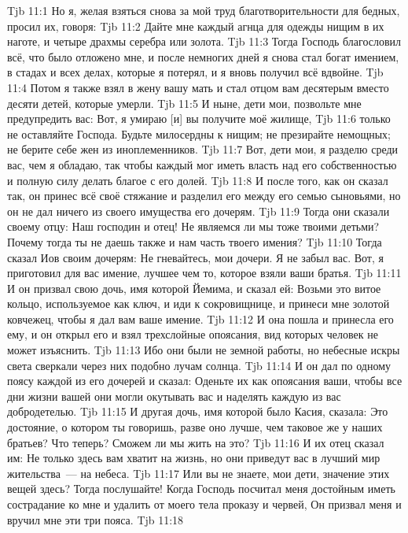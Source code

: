 \vs Tjb 11:1
Но я, желая взяться снова за мой труд благотворительности для бедных, просил их, говоря:
\vs Tjb 11:2
Дайте мне каждый агнца для одежды нищим в их наготе, и четыре драхмы серебра или золота.
\vs Tjb 11:3
Тогда Господь благословил всё, что было отложено мне, и после немногих дней я снова стал богат имением, в стадах и всех делах, которые я потерял, и я вновь получил всё вдвойне.
\vs Tjb 11:4
Потом я также взял в жену вашу мать и стал отцом вам десятерым вместо десяти детей, которые умерли.
\vs Tjb 11:5
И ныне, дети мои, позвольте мне предупредить вас: Вот, я умираю [и] вы получите моё жилище,
\vs Tjb 11:6
только не оставляйте Господа. Будьте милосердны к нищим; не презирайте немощных; не берите себе жен из иноплеменников.
\vs Tjb 11:7
Вот, дети мои, я разделю среди вас, чем я обладаю, так чтобы каждый мог иметь власть над его собственностью и полную силу делать благое с его долей.
\vs Tjb 11:8
И после того, как он сказал так, он принес всё своё стяжание и разделил его между его семью сыновьями, но он не дал ничего из своего имущества его дочерям.
\vs Tjb 11:9
Тогда они сказали своему отцу: Наш господин и отец! Не являемся ли мы тоже твоими детьми? Почему тогда ты не даешь также и нам часть твоего имения?
\vs Tjb 11:10
Тогда сказал Иов своим дочерям: Не гневайтесь, мои дочери. Я не забыл вас. Вот, я приготовил для вас имение, лучшее чем то, которое взяли ваши братья.
\vs Tjb 11:11
И он призвал свою дочь, имя которой Йемима, и сказал ей: Возьми это витое кольцо, используемое как ключ, и иди к сокровищнице, и принеси мне золотой ковчежец, чтобы я дал вам ваше имение.
\vs Tjb 11:12
И она пошла и принесла его ему, и он открыл его и взял трехслойные опоясания, вид которых человек не может изъяснить.
\vs Tjb 11:13
Ибо они были не земной работы, но небесные искры света сверкали через них подобно лучам солнца.
\vs Tjb 11:14
И он дал по одному поясу каждой из его дочерей и сказал: Оденьте их как опоясания ваши, чтобы все дни жизни вашей они могли окутывать вас и наделять каждую из вас добродетелью.
\vs Tjb 11:15
И другая дочь, имя которой было Касия, сказала: Это достояние, о котором ты говоришь, разве оно лучше, чем таковое же у наших братьев? Что теперь? Сможем ли мы жить на это?
\vs Tjb 11:16
И их отец сказал им: Не только здесь вам хватит на жизнь, но они приведут вас в лучший мир жительства~--- на небеса.
\vs Tjb 11:17
Или вы не знаете, мои дети, значение этих вещей здесь? Тогда послушайте! Когда Господь посчитал меня достойным иметь сострадание ко мне и удалить от моего тела проказу и червей, Он призвал меня и вручил мне эти три пояса.
\vs Tjb 11:18
